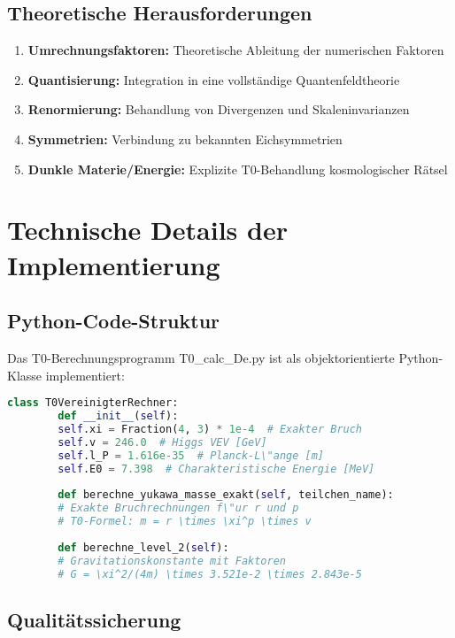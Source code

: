 \documentclass[11pt,a4paper]{article}
\begin{document}
	\subsection{Theoretische Herausforderungen}
	
	\begin{enumerate}
		\item \textbf{Umrechnungsfaktoren:} Theoretische Ableitung der numerischen Faktoren
		\item \textbf{Quantisierung:} Integration in eine vollst\"{a}ndige Quantenfeldtheorie
		\item \textbf{Renormierung:} Behandlung von Divergenzen und Skaleninvarianzen
		\item \textbf{Symmetrien:} Verbindung zu bekannten Eichsymmetrien
		\item \textbf{Dunkle Materie/Energie:} Explizite T0-Behandlung kosmologischer R\"{a}tsel
	\end{enumerate}
	
	\section{Technische Details der Implementierung}
	
	\subsection{Python-Code-Struktur}
	
	Das T0-Berechnungsprogramm T0\_calc\_De.py ist als objektorientierte Python-Klasse implementiert:
	
	\begin{lstlisting}[language=Python, basicstyle=\small\ttfamily]
		class T0VereinigterRechner:
		def __init__(self):
		self.xi = Fraction(4, 3) * 1e-4  # Exakter Bruch
		self.v = 246.0  # Higgs VEV [GeV]
		self.l_P = 1.616e-35  # Planck-L\"ange [m]
		self.E0 = 7.398  # Charakteristische Energie [MeV]
		
		def berechne_yukawa_masse_exakt(self, teilchen_name):
		# Exakte Bruchrechnungen f\"ur r und p
		# T0-Formel: m = r \times \xi^p \times v
		
		def berechne_level_2(self):
		# Gravitationskonstante mit Faktoren
		# G = \xi^2/(4m) \times 3.521e-2 \times 2.843e-5
	\end{lstlisting}
	
	\subsection{Qualitätssicherung}
	
\end{document}
